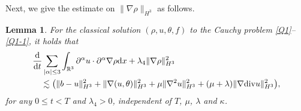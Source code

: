 \documentclass[reqno,11pt]{amsart}
\theoremstyle{plain}
\newtheorem{lem}[thm]{Lemma}
\numberwithin{equation}{section}
\begin{document}
Next, we give the estimate on $\|\nabla\rho\|_{H^3}$ as follows. 
\begin{lem}\label{L3.4}
For  the classical solution $(\rho, u,\theta,f)$ to the Cauchy problem \eqref{Q1}--\eqref{Q1-1}, it holds that 
\begin{align}\label{G3.25}
& \frac{\mathrm{d}}{\mathrm{d} t} \sum_{|\alpha| \leq 3} \int_{\mathbb{R}^3} \partial^\alpha u \cdot \partial^\alpha \nabla \rho \mathrm{d} x+\lambda_4\|\nabla \rho\|_{H^3}^2 \nonumber\\
&\quad\lesssim  \big(\|b-u\|_{H^3}^2+\|\nabla (u,\theta)\|_{H^3}^2+ \mu\|\nabla^2u\|_{H^3}^2+(\mu+\lambda)\|\nabla {\rm div}u\|_{H^3}^2\big),
\end{align} 
for any $0 \leq t <T$ and $\lambda_4>0$, independent of   $T$, $\mu$, $\lambda$ and
$\kappa$. 
\end{lem}
\end{document}
